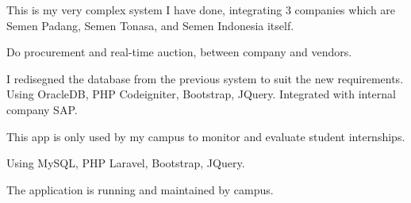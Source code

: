 \documentclass[letterpaper]{deedy-resume} %
\begin{document}
\begin{minipage}[t]{0.66\textwidth}
\begin{tightitemize}
\item This is my very complex system I have done, integrating 3 companies which are Semen Padang, Semen Tonasa, and Semen Indonesia itself.
\item Do procurement and real-time auction, between company and vendors.
\item I redisegned the database from the previous system to suit the new requirements. Using OracleDB, PHP Codeigniter, Bootstrap, JQuery. Integrated with internal company SAP.
\end{tightitemize}
\sectionspace

\begin{tightitemize}
\item This app is only used by my campus to monitor and evaluate student internships.
\item Using MySQL, PHP Laravel, Bootstrap, JQuery.
\item The application is running and maintained by campus.
\end{tightitemize}
\sectionspace






\end{minipage} %
\end{document}
